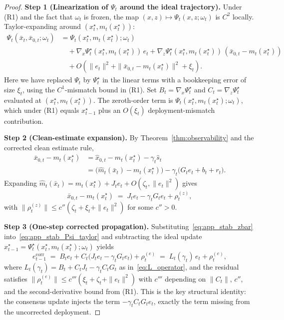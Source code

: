 \documentclass{article}
\theoremstyle{plain}
\theoremstyle{definition}
\theoremstyle{remark}
\begin{document}
\begin{proof}
\textbf{Step 1 (Linearization of \(\Psi_t\) around the ideal trajectory).}
Under (R1) and the fact that \(\omega_t\) is frozen, the map
\((x,z)\mapsto\Psi_t(x,z;\omega_t)\) is \(C^2\) locally. Taylor-expanding
around \((x_t^\star, m_t(x_t^\star))\):
\begin{align}
\Psi_t(\bar x_t, \bar x_{0,t};\omega_t)
&= \Psi_t(x_t^\star, m_t(x_t^\star);\omega_t) \nonumber\\
&\quad+ \nabla_x \Psi_t^\star (x_t^\star,m_t(x_t^\star))\,e_t
 + \nabla_z \Psi_t^\star (x_t^\star,m_t(x_t^\star))\,(\bar x_{0,t} - m_t(x_t^\star))
 \nonumber\\
&\quad+ O(\|e_t\|^2 + \|\bar x_{0,t} - m_t(x_t^\star)\|^2 + \xi_t).
\label{eq:app_stab_Psi_taylor}
\end{align}
Here we have replaced \(\Psi_t\) by \(\Psi_t^\star\) in the linear terms
with a bookkeeping error of size \(\xi_t\), using the \(C^1\)-mismatch
bound in (R1). Set \(B_t = \nabla_x\Psi_t^\star\) and
\(C_t = \nabla_z\Psi_t^\star\) evaluated at \((x_t^\star, m_t(x_t^\star))\).
The zeroth-order term is
\(\Psi_t(x_t^\star,m_t(x_t^\star);\omega_t)\), which under (R1) equals
\(x_{t-1}^\star\) plus an \(O(\xi_t)\) deployment-mismatch contribution.

\textbf{Step 2 (Clean-estimate expansion).}
By Theorem~\ref{thm:observability} and the corrected clean estimate rule,
\begin{align*}
\bar x_{0,t} - m_t(x_t^\star)
&= \hat x_{0,t} - m_t(x_t^\star) - \gamma_t \hat s_t \\
&= \bigl(\hat m_t(\bar x_t) - m_t(x_t^\star)\bigr) - \gamma_t\bigl(G_t e_t + b_t + r_t\bigr).
\end{align*}
Expanding \(\hat m_t(\bar x_t) = m_t(x_t^\star) + J_t e_t + O(\zeta_t,
\|e_t\|^2)\) gives
\begin{equation}
\bar x_{0,t} - m_t(x_t^\star)
\;=\; J_t e_t - \gamma_t G_t e_t + \rho_t^{(z)},
\label{eq:app_stab_zbar}
\end{equation}
with
\(\|\rho_t^{(z)}\| \le c''(\zeta_t + \xi_t + \|e_t\|^2)\) for some
\(c''>0\).

\textbf{Step 3 (One-step corrected propagation).}
Substituting~\eqref{eq:app_stab_zbar} into~\eqref{eq:app_stab_Psi_taylor}
and subtracting the ideal update
\(x_{t-1}^\star = \Psi_t^\star(x_t^\star,m_t(x_t^\star);\omega_t)\) yields
\begin{equation}
e_{t-1}^{\mathrm{corr}}
\;=\; B_t e_t + C_t\bigl(J_t e_t - \gamma_t G_t e_t\bigr)
 + \rho_t^{(e)}
\;=\; L_t(\gamma_t)\,e_t + \rho_t^{(e)},
\label{eq:app_stab_onestep}
\end{equation}
where \(L_t(\gamma_t) = B_t + C_t J_t - \gamma_t C_t G_t\) as
in~\eqref{eq:L_operator}, and the residual satisfies
\(\|\rho_t^{(e)}\| \le c'''(\xi_t + \zeta_t + \|e_t\|^2)\) with
\(c'''\) depending on \(\|C_t\|\), \(c''\), and the second-derivative
bound from (R1). This is the key structural identity: the consensus update
injects the term \(-\gamma_t C_t G_t e_t\), exactly the term missing from
the uncorrected deployment.


\end{proof}
\end{document}
